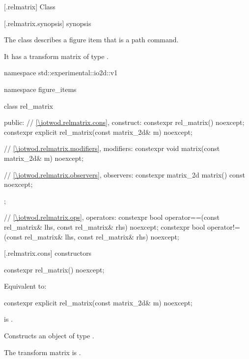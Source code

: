  [\iotwod.relmatrix] {Class }%

 [\iotwod.relmatrix.synopsis] { synopsis}%

\pnum
{}%
The class  describes a figure item that is a path command.

\pnum
It has a transform matrix of type .

\begin{codeblock}
namespace std::experimental::io2d::v1 {
  namespace figure_items {
    class rel_matrix {
    public:
      // \ref{\iotwod.relmatrix.cons}, construct:
      constexpr rel_matrix() noexcept;
      constexpr explicit rel_matrix(const matrix_2d& m) noexcept;

      // \ref{\iotwod.relmatrix.modifiers}, modifiers:
      constexpr void matrix(const matrix_2d& m) noexcept;

      // \ref{\iotwod.relmatrix.observers}, observers:
      constexpr matrix_2d matrix() const noexcept;
    };
    
    // \ref{\iotwod.relmatrix.ops}, operators:
    constexpr bool operator==(const rel_matrix& lhs, const rel_matrix& rhs) 
      noexcept;
    constexpr bool operator!=(const rel_matrix& lhs, const rel_matrix& rhs) 
      noexcept;
  }
}
\end{codeblock}

 [\iotwod.relmatrix.cons] { constructors}

%
\begin{itemdecl}
constexpr rel_matrix() noexcept;
\end{itemdecl}
\begin{itemdescr}
\pnum
\effects
Equivalent to: 
\end{itemdescr}

%
\begin{itemdecl}
constexpr explicit rel_matrix(const matrix_2d& m) noexcept;
\end{itemdecl}
\begin{itemdescr}
\pnum
\requires
{} is .

\pnum
\effects
Constructs an object of type .

\pnum
The transform matrix is .
\end{itemdescr}

